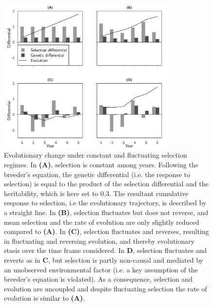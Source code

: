 \begin{figure}[H]
\centering
	\includegraphics[width=0.8\textwidth]{FiguresFluSel/concetpualplot-1}
	\caption{\footnotesize Evolutionary change under constant and fluctuating selection regimes. 
	In \textbf{(A)}, selection is constant among years. Following the breeder's equation, the genetic differential (i.e. the response to selection) is equal to the product of the selection differential and the heritability, which is here set to $0.3$. The resultant cumulative response to selection, i.e the evolutionary trajectory, is described by a straight line. 
	In \textbf{(B)}, selection fluctuates but does not reverse, and mean selection and the rate of evolution are only slightly reduced compared to \textbf{(A)}.
	In \textbf{(C)}, selection fluctuates and reverses, resulting in fluctuating and reversing evolution, and thereby evolutionary stasis over the time frame considered. 
	In \textbf{D}, selection fluctuates and reverts as in \textbf{C}, but selection is partly non-causal and mediated by an unobserved environmental factor (i.e. a key assumption of the breeder's equation is violated). As a consequence, selection and evolution are uncoupled and despite fluctuating selection the rate of evolution is similar to \textbf{(A)}.}
	\label{fig:concept}
\end{figure}


